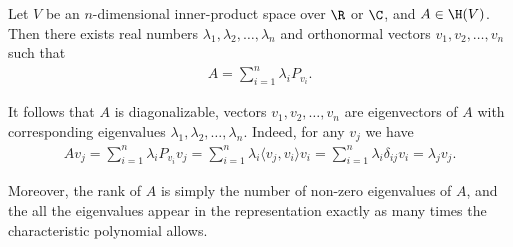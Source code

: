 \begin{lause}
	Let $V$ be an $n$-dimensional inner-product space over $\R$ or $\C$, and $A \in \H(V)$. Then there exists real numbers $\lambda_{1}, \lambda_{2}, \ldots, \lambda_{n}$ and orthonormal vectors $v_{1}, v_{2}, \ldots, v_{n}$ such that
	\begin{align}\label{spectralrepr}
		A = \sum_{i = 1}^{n} \lambda_{i} P_{v_{i}}.
	\end{align}
\end{lause}

It follows that $A$ is diagonalizable, vectors $v_{1}, v_{2}, \ldots, v_{n}$ are eigenvectors of $A$ with corresponding eigenvalues $\lambda_{1}, \lambda_{2}, \ldots, \lambda_{n}$. Indeed, for any $v_{j}$ we have
\begin{align}
	A v_{j} = \sum_{i = 1}^{n} \lambda_{i} P_{v_{i}} v_{j} = \sum_{i = 1}^{n} \lambda_{i} \langle v_{j}, v_{i}\rangle v_{i} = \sum_{i = 1}^{n} \lambda_{i} \delta_{ij} v_{i} = \lambda_{j} v_{j}.
\end{align}

Moreover, the rank of $A$ is simply the number of non-zero eigenvalues of $A$, and the all the eigenvalues appear in the representation exactly as many times the characteristic polynomial allows.

